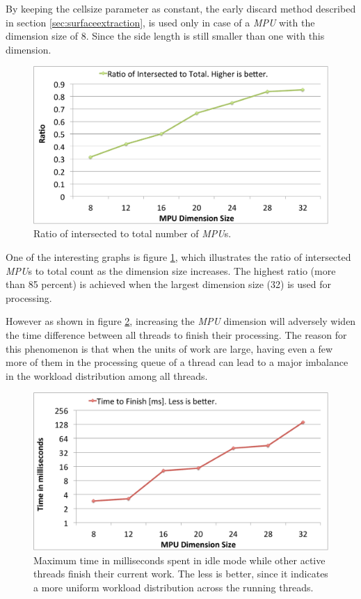 By keeping the cellsize parameter as constant, the early discard method described 
in section \ref{sec:surfaceextraction}, is used only in case of a \textit{MPU} 
with the dimension size of 8. Since the side length is still smaller than one
with this dimension. 

\begin{figure}[H]
  \centering
  \includegraphics[width = 1.0\linewidth]{figures/cpupoly/MpuSizeAnalysis/RatioOfIntersectedToTotal.pdf}
  \caption{\label{fig:RatioOfIntersectedToTotal}
  {Ratio of intersected to total number of \textit{MPU}s.}
}
\end{figure}

One of the interesting graphs is figure \ref{fig:RatioOfIntersectedToTotal}, which illustrates the
ratio of intersected \textit{MPU}s to total count as the dimension size increases. The highest
ratio (more than 85 percent) is achieved when the largest dimension size (32) is used for processing.  

However as shown in figure \ref{fig:TimeToFinish}, increasing the \textit{MPU} dimension will adversely widen the
time difference between all threads to finish their processing. The reason for this phenomenon 
is that when the units of work are large, having even a few more of them in the processing 
queue of a thread can lead to a major imbalance in the workload distribution among all threads.

\begin{figure}[H]
  \centering
  \includegraphics[width = 1.0\linewidth]{figures/cpupoly/MpuSizeAnalysis/TimeToFinish.pdf}
  \caption{\label{fig:TimeToFinish}
  {Maximum time in milliseconds spent in idle mode while other active threads finish their current work.
  The less is better, since it indicates a more uniform workload distribution across the running threads.}
}
\end{figure}

